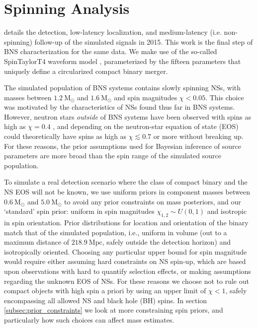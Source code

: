 \section{Spinning Analysis}
\label{sec:spin}

\citet{Singer_2014} details the detection, low-latency localization, and medium-latency (i.e. non-spinning) follow-up of the simulated signals in 2015. This work is the final step of BNS characterization for the same data. We make use of the so-called SpinTaylorT4 waveform model \citep{Buonanno_2003,Buonanno_2009}, parameterized by the fifteen parameters that uniquely define a circularized compact binary merger.

The simulated population of BNS systems contains slowly spinning NSs, with masses between $1.2~\mathrm{M}_\odot$ and $1.6~\mathrm{M}_\odot$ and spin magnitudes $\chi < 0.05$.  This choice was motivated by the characteristics of NSs found thus far in BNS systems. However, neutron stars \emph{outside} of BNS systems have been observed with spins as high as $\chi = 0.4$ \citep{Hessels_2006,Brown_2012}, and depending on the neutron-star equation of state (EOS) could theoretically have spins as high as $\chi \lesssim 0.7$ \citep{Lo_2011} or more without breaking up.  For these reasons, the prior assumptions used for Bayesian inference of source parameters are more broad than the spin range of the simulated source population.

To simulate a real detection scenario where the class of compact binary and the NS EOS will not be known, we use uniform priors in component masses between $0.6~\mathrm{M}_\odot$ and $5.0~\mathrm{M}_\odot$ to avoid any prior constraints on mass posteriors, and our `standard' spin prior: uniform in spin magnitudes $\chi_{1,2} \sim U(0, 1)$ and isotropic in spin orientation. Prior distributions for location and orientation of the binary match that of the simulated population, i.e., uniform in volume (out to a maximum distance of $218.9~\mathrm{Mpc}$, safely outside the detection horizon) and isotropically oriented.  Choosing any particular upper bound for spin magnitude would require either assuming hard constraints on NS spin-up, which are based upon observations with hard to quantify selection effects, or making assumptions regarding the unknown EOS of NSs. For these reasons we choose not to rule out compact objects with high spin a priori by using an upper limit of $\chi < 1$, safely encompassing all allowed NS and black hole (BH) spins.  In section \ref{subsec:prior_constraints} we look at more constraining spin priors, and particularly how such choices can affect mass estimates.
  
  